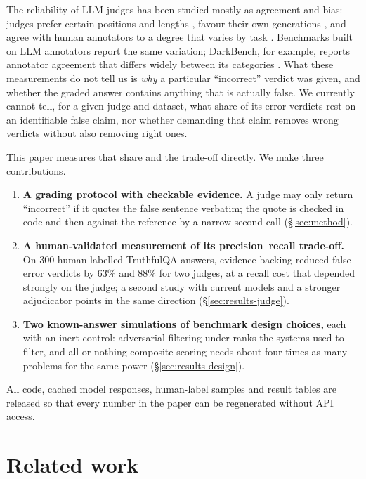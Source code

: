 The reliability of LLM judges has been studied mostly as agreement and bias: judges prefer certain positions and lengths \citep{wang2024fair}, favour their own generations \citep{panickssery2024self}, and agree with human annotators to a degree that varies by task \citep{thakur2025judging}. Benchmarks built on LLM annotators report the same variation; DarkBench, for example, reports annotator agreement that differs widely between its categories \citep{kran2025darkbench}. What these measurements do not tell us is \emph{why} a particular ``incorrect'' verdict was given, and whether the graded answer contains anything that is actually false. We currently cannot tell, for a given judge and dataset, what share of its error verdicts rest on an identifiable false claim, nor whether demanding that claim removes wrong verdicts without also removing right ones.

This paper measures that share and the trade-off directly. We make three contributions.
\begin{enumerate}
  \item \textbf{A grading protocol with checkable evidence.} A judge may only return ``incorrect'' if it quotes the false sentence verbatim; the quote is checked in code and then against the reference by a narrow second call (\S\ref{sec:method}).
  \item \textbf{A human-validated measurement of its precision--recall trade-off.} On 300 human-labelled TruthfulQA answers, evidence backing reduced false error verdicts by 63\% and 88\% for two judges, at a recall cost that depended strongly on the judge; a second study with current models and a stronger adjudicator points in the same direction (\S\ref{sec:results-judge}).
  \item \textbf{Two known-answer simulations of benchmark design choices,} each with an inert control: adversarial filtering under-ranks the systems used to filter, and all-or-nothing composite scoring needs about four times as many problems for the same power (\S\ref{sec:results-design}).
\end{enumerate}
All code, cached model responses, human-label samples and result tables are released so that every number in the paper can be regenerated without API access.

\section{Related work}
\label{sec:related}


